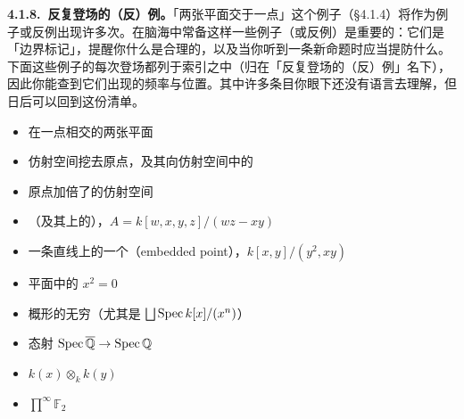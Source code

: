 \textbf{4.1.8.\ 反复登场的（反）例。}\quad 「两张平面交于一点」这个例子（\S4.1.4）将作为例子或反例出现许多次。在脑海中常备这样一些例子（或反例）是重要的：它们是「边界标记」，提醒你什么是合理的，以及当你听到一条新命题时应当提防什么。下面这些例子的每次登场都列于索引之中（归在「反复登场的（反）例」名下），因此你能查到它们出现的频率与位置。其中许多条目你眼下还没有语言去理解，但日后可以回到这份清单。
\begin{itemize}
\item 在一点相交的两张平面
\item 仿射空间挖去原点，及其向仿射空间中的\trInclusionMap
\item 原点加倍了的仿射空间
\item \trQuadricSurface{}（及其上的\trCone），$A=k[w,x,y,z]/(wz-xy)$
\item 一条直线上的一个\textbf{\trEmbeddedPoint{}}（embedded point），$k[x,y]/(y^2,xy)$
\item \trProjective{}平面中的 $x^2=0$
\item 概形的无穷\trDisjointUnion{}（尤其是 $\bigsqcup\operatorname{Spec} k[x]/(x^n)$）
\item 态射 $\operatorname{Spec}\overline{\mathbb{Q}}\to\operatorname{Spec}\mathbb{Q}$
\item $k(x)\otimes_k k(y)$
\item $\prod^{\infty}\mathbb{F}_2$
\end{itemize}
